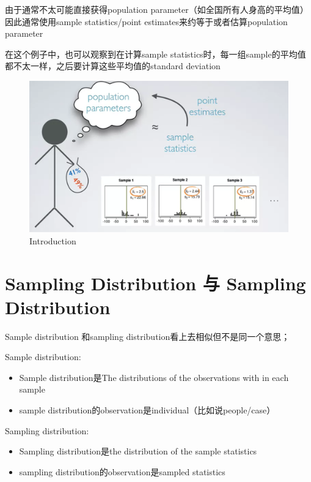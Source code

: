 \documentclass[]{book}
\providecommand{\tightlist}{%
  \setlength{\itemsep}{0pt}\setlength{\parskip}{0pt}}
\begin{document}
由于通常不太可能直接获得population
parameter（如全国所有人身高的平均值）因此通常使用sample statistics/point
estimates来约等于或者估算population parameter

在这个例子中，也可以观察到在计算sample
statistics时，每一组sample的平均值都不太一样，之后要计算这些平均值的standard
deviation

\begin{figure}

{\centering \includegraphics[width=0.8\linewidth]{graphs/1-2} 

}

\caption{Introduction}\label{fig:fig1}
\end{figure}

\section{Sampling Distribution 与 Sampling
Distribution}\label{sampling-distribution-ux4e0e-sampling-distribution}

Sample distribution 和sampling distribution看上去相似但不是同一个意思；

Sample distribution:

\begin{itemize}
\tightlist
\item
  Sample distribution是The distributions of the observations with in
  each sample
\item
  sample distribution的observation是individual（比如说people/case）
\end{itemize}

Sampling distribution:

\begin{itemize}
\tightlist
\item
  Sampling distribution是the distribution of the sample statistics
\item
  sampling distribution的observation是sampled statistics
\end{itemize}
\end{document}

